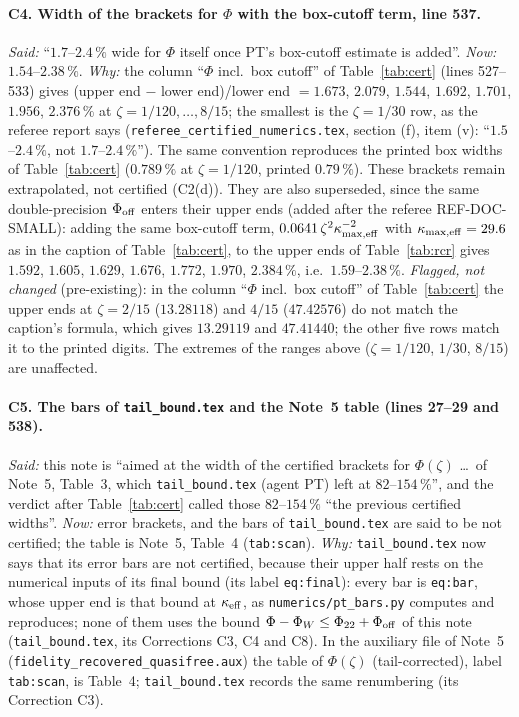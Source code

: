 \documentclass[11pt]{article}
\begin{document}
\paragraph{C4. Width of the brackets for $\Phi$ with the box-cutoff term, line 537.}
\emph{Said:} ``$1.7$--$2.4\,\%$ wide for $\Phi$ itself once PT's box-cutoff estimate is added''.
\emph{Now:} $1.54$--$2.38\,\%$.  \emph{Why:} the column ``$\Phi$ incl.\ box cutoff'' of
Table~\ref{tab:cert} (lines 527--533) gives (upper end $-$ lower end)/lower end $=1.673$, $2.079$,
$1.544$, $1.692$, $1.701$, $1.956$, $2.376\,\%$ at $\zeta=1/120,\dots,8/15$; the smallest is the
$\zeta=1/30$ row, as the referee report says (\texttt{referee\_certified\_numerics.tex}, section
(f), item (v): ``$1.5$--$2.4\,\%$, not $1.7$--$2.4\,\%$'').  The same convention reproduces the
printed box widths of Table~\ref{tab:cert} ($0.789\,\%$ at $\zeta=1/120$, printed $0.79\,\%$).
These brackets remain extrapolated, not certified (C2(d)).  They are also superseded, since the
same double-precision $\Phi_{\rm off}$ enters their upper ends (added after the referee
REF-DOC-SMALL): adding the same box-cutoff term, $0.0641\,\zeta^2\kappa_{\max,\rm eff}^{-2}$ with
$\kappa_{\max,\rm eff}=29.6$ as in the caption of Table~\ref{tab:cert}, to the upper ends of
Table~\ref{tab:rcr} gives $1.592$, $1.605$, $1.629$, $1.676$, $1.772$, $1.970$, $2.384\,\%$, i.e.\
$1.59$--$2.38\,\%$.
\emph{Flagged, not changed} (pre-existing): in the column ``$\Phi$ incl.\ box cutoff'' of
Table~\ref{tab:cert} the upper ends at $\zeta=2/15$ ($13.28118$) and $4/15$ ($47.42576$) do not
match the caption's formula, which gives $13.29119$ and $47.41440$; the other five rows match it
to the printed digits.  The extremes of the ranges above ($\zeta=1/120$, $1/30$, $8/15$) are
unaffected.

\paragraph{C5. The bars of \texttt{tail\_bound.tex} and the Note~5 table (lines 27--29 and 538).}
\emph{Said:} this note is ``aimed at the width of the certified brackets for $\Phi(\zeta)$ \dots\
of Note~5, Table~3, which \texttt{tail\_bound.tex} (agent PT) left at $82$--$154\,\%$'', and the
verdict after Table~\ref{tab:cert} called those $82$--$154\,\%$ ``the previous certified widths''.
\emph{Now:} error brackets, and the bars of \texttt{tail\_bound.tex} are said to be not certified;
the table is Note~5, Table~4 (\texttt{tab:scan}).  \emph{Why:} \texttt{tail\_bound.tex} now says
that its error bars are not certified, because their upper half rests on the numerical inputs of
its final bound (its label \texttt{eq:final}): every bar is \texttt{eq:bar}, whose upper end is
that bound at $\kappa_{\rm eff}$, as \texttt{numerics/pt\_bars.py} computes and reproduces; none of
them uses the bound $\Phi-\Phi_W\le\Phi_{22}+\Phi_{\rm off}$ of this note (\texttt{tail\_bound.tex},
its Corrections C3, C4 and C8).  In the auxiliary file of Note~5
(\texttt{fidelity\_recovered\_quasifree.aux}) the table of $\Phi(\zeta)$ (tail-corrected), label
\texttt{tab:scan}, is Table~4; \texttt{tail\_bound.tex} records the same renumbering (its
Correction C3).
\end{document}
